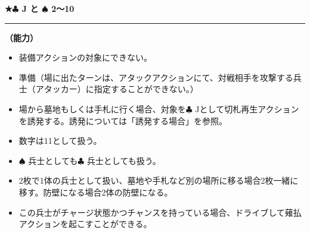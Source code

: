 \documentclass[twocolumn,a5paper,papersize,10pt]{jarticle}
\begin{document}
\vspace{-1zh}

 
\vspace{2mm}
\begin{tcolorbox}[title={\small\bf【Character】騎士}{\scriptsize （兵士）}]

  {\scriptsize\bf ★{\normalsize $\clubsuit$} J と {\normalsize $\spadesuit$} 2〜10}

\vspace{1mm} %
\hrule height 0.1mm depth 0mm width 62mm %
\vspace{1mm} %

{\bf（能力）}


\vspace{-1zh}%
\begin{itemize}
\setlength{\leftskip}{-0.3cm}
\setlength{\parskip}{0pt} %

\item 装備アクションの対象にできない。

\item 準備（場に出たターンは、アタックアクションにて、対戦相手を攻撃する兵士（アタッカー）に指定することができない。）

\item 場から墓地もしくは手札に行く場合、対象を{\normalsize $\clubsuit$} Jとして切札再生アクションを誘発する。誘発については「誘発する場合」を参照。

\item 数字は11として扱う。

\item {\normalsize $\spadesuit$} 兵士としても{\normalsize $\clubsuit$} 兵士としても扱う。

\item 2枚で1体の兵士として扱い、墓地や手札など別の場所に移る場合2枚一緒に移す。防壁になる場合2体の防壁になる。

\item この兵士がチャージ状態かつチャンスを持っている場合、ドライブして薙払アクションを起こすことができる。
\vspace{-1zh}%
\end{itemize}

\vspace{1mm} %
\end{tcolorbox}

\vspace{-1zh}
\end{document}
